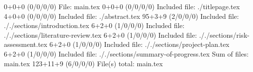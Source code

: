 0+0+0 (0/0/0/0) File: main.tex
0+0+0 (0/0/0/0) Included file: ./titlepage.tex
4+0+0 (0/0/0/0) Included file: ./abstract.tex
95+3+9 (2/0/0/0) Included file: ././sections/introduction.tex
6+2+0 (1/0/0/0) Included file: ././sections/literature-review.tex
6+2+0 (1/0/0/0) Included file: ././sections/risk-assessment.tex
6+2+0 (1/0/0/0) Included file: ././sections/project-plan.tex
6+2+0 (1/0/0/0) Included file: ././sections/summary-of-progress.tex
Sum of files: main.tex
123+11+9 (6/0/0/0) File(s) total: main.tex
